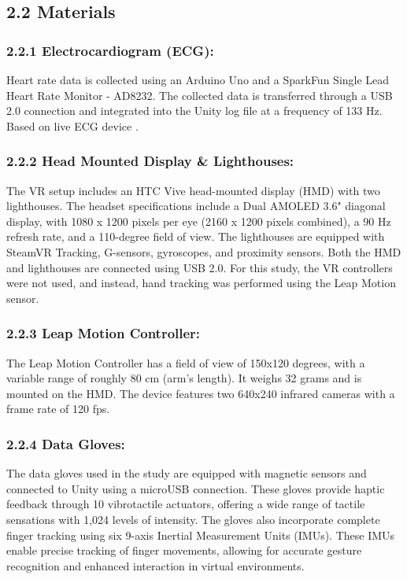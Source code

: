 \documentclass[12pt,oneside,openright]{report}
\begin{document}
    \subsection*{2.2 Materials}
    \subsubsection*{2.2.1 Electrocardiogram (ECG):}
Heart rate data is collected using an Arduino Uno and a SparkFun Single Lead Heart Rate Monitor - AD8232. The collected data is transferred through a USB 2.0 connection and integrated into the Unity log file at a frequency of 133 Hz. Based on live ECG device \parencite{TimsECG}.

\subsubsection*{2.2.2 Head Mounted Display \& Lighthouses:}
The VR setup includes an HTC Vive head-mounted display (HMD) with two lighthouses. The headset specifications include a Dual AMOLED 3.6" diagonal display, with 1080 x 1200 pixels per eye (2160 x 1200 pixels combined), a 90 Hz refresh rate, and a 110-degree field of view. The lighthouses are equipped with SteamVR Tracking, G-sensors, gyroscopes, and proximity sensors. Both the HMD and lighthouses are connected using USB 2.0. For this study, the VR controllers were not used, and instead, hand tracking was performed using the Leap Motion sensor.

\subsubsection*{2.2.3 Leap Motion Controller:}
The Leap Motion Controller has a field of view of 150x120 degrees, with a variable range of roughly 80 cm (arm's length). It weighs 32 grams and is mounted on the HMD. The device features two 640x240 infrared cameras with a frame rate of 120 fps.

\subsubsection*{2.2.4 Data Gloves:}
The data gloves used in the study are equipped with magnetic sensors and connected to Unity using a microUSB connection. These gloves provide haptic feedback through 10 vibrotactile actuators, offering a wide range of tactile sensations with 1,024 levels of intensity. The gloves also incorporate complete finger tracking using six 9-axis Inertial Measurement Units (IMUs). These IMUs enable precise tracking of finger movements, allowing for accurate gesture recognition and enhanced interaction in virtual environments.
\end{document}
